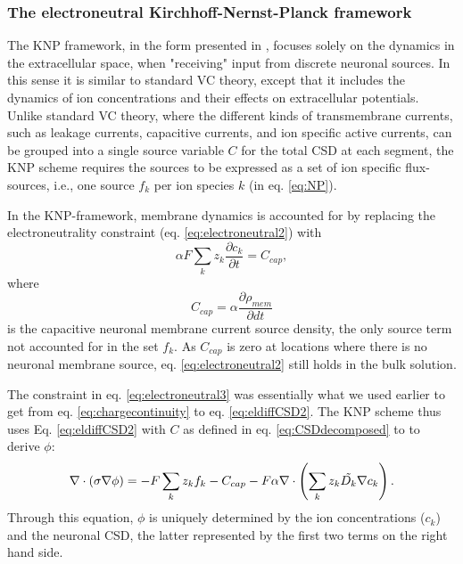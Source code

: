 \subsubsection{The electroneutral Kirchhoff-Nernst-Planck framework}
The KNP framework, in the form presented in \cite{Solbra2018}, focuses solely on the dynamics in the extracellular space, when "receiving" input from discrete neuronal sources. In this sense it is similar to standard VC theory, except that it includes the dynamics of ion concentrations and their effects on extracellular potentials. Unlike standard VC theory, where the different kinds of transmembrane currents, such as leakage currents, capacitive currents, and ion specific active currents, can be grouped into a single source variable $C$ for the total CSD at each segment, the KNP scheme requires the sources to be expressed as a set of ion specific flux-sources, i.e., one source $f_k$ per ion species $k$ (in eq. \ref{eq:NP}). 

In the KNP-framework, membrane dynamics is accounted for by replacing the electroneutrality constraint (eq. \ref{eq:electroneutral2}) with
\begin{equation}
\alpha F \sum_k{z_k \frac{\partial c_k}{\partial t}} = C_{cap},
\label{eq:electroneutral3}
\end{equation}
where \begin{equation}
C_{cap} = {\alpha}\frac{\partial \rho_{mem}}{\partial dt}
\label{eq:Andreas}
\end{equation}
is the capacitive neuronal membrane current source density, the only source term not accounted for in the set $f_k$. As $C_{cap}$ is zero at locations where there is no neuronal membrane source, eq. \ref{eq:electroneutral2} still holds in the bulk solution. 

The constraint in eq. \ref{eq:electroneutral3} was essentially what we used earlier to get from eq. \ref{eq:chargecontinuity} to eq. \ref{eq:eldiffCSD2}. The KNP scheme thus uses Eq. \ref{eq:eldiffCSD2} with $C$ as defined in eq.  \ref{eq:CSDdecomposed} to to derive $\phi$:
\begin{equation}
\nabla \cdot (\sigma\nabla\phi) = - F \sum_k z_k f_k -  C_{cap} - F\alpha \nabla \cdot \left (\sum_k{z_k \tilde{D_k}{\bf \nabla} c_{k}} \right).
\label{eq:KNPfinal}
\end{equation}
Through this equation, $\phi$ is uniquely determined by the ion concentrations ($c_k$) and the neuronal CSD, the latter represented by the first two terms on the right hand side.

